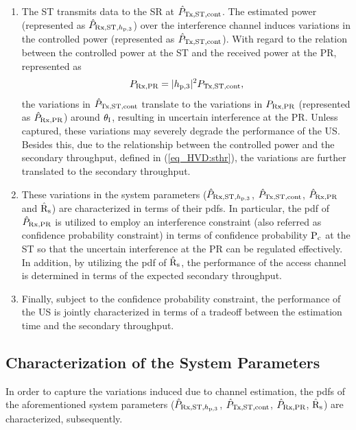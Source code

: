 \begin{enumerate}
	\item The ST transmits data to the SR at $\hat{P}_{\text{Tx,ST,cont}}$. 
	The estimated power (represented as $\hat{P}_{\text{Rx,ST,$h_{\text{p,3}}$}}$) over the interference channel induces variations in the controlled power (represented as $\hat{P}_{\text{Tx,ST,cont}}$). With regard to the relation between the controlled power at the ST and the received power at the PR, represented as 
\begin{align}
P_{\text{Rx,PR}}  = |h_{\text{p,3}}|^2 P_{\text{Tx,ST,cont}},
\label{eq_HVD:eprcvdpr}
\end{align}
the variations in $\hat{P}_{\text{Tx,ST,cont}}$ translate to the variations in $P_{\text{Rx,PR}}$ (represented as $\hat{P}_{\text{Rx,PR}}$) around $\theta_{\text{I}}$, resulting in uncertain interference at the PR. Unless captured, these variations may severely degrade the performance of the US. Besides this, due to the relationship between the controlled power and the secondary throughput, defined in (\ref{eq_HVD:sthr}), the variations are further translated to the secondary throughput. 
\item These variations in the system parameters ($\hat{P}_{\text{Rx,ST,$h_{\text{p,3}}$}}$, $\hat{P}_{\text{Tx,ST,cont}}$, $\hat{P}_{\text{Rx,PR}}$ and $\hat{\text{{R}}}_{\text{s}}$) are characterized in terms of their pdfs. In particular, the pdf of $\hat{P}_{\text{Rx,PR}}$ is utilized to employ an interference constraint (also referred as confidence probability constraint) in terms of confidence probability $\text{P}_{\text{c}}$ at the ST so that the uncertain interference at the PR can be regulated effectively. In addition, by utilizing the pdf of $\hat{\text{{R}}}_{\text{s}}$, the performance of the access channel is determined in terms of the expected secondary throughput. \item Finally, subject to the confidence probability constraint, the performance of the US is jointly characterized in terms of a tradeoff between the estimation time and the secondary throughput. 
\end{enumerate}

\subsection{Characterization of the System Parameters}
In order to capture the variations induced due to channel estimation, the pdfs of the aforementioned system parameters ($\hat{P}_{\text{Rx,ST,$h_{\text{p,3}}$}}$, $\hat{P}_{\text{Tx,ST,cont}}$, $\hat{P}_{\text{Rx,PR}}$, $\hat{\text{{R}}}_{\text{s}}$) are characterized, subsequently. 


